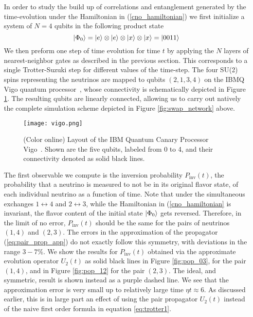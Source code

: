 \documentclass[10pt]{article}
\begin{document}
In order to study the build up of correlations and entanglement generated by the time-evolution under the Hamiltonian in (\ref{cno_hamiltonian}) we first initialize a system of $N=4$ qubits in the following product state 
\begin{equation}
\ket{\Phi_0} = \ket{e}\otimes\ket{e}\otimes\ket{x}\otimes\ket{x} = \ket{0011}
\end{equation}
We then preform one step of time evolution for time $t$ by applying the $N$ layers of nearest-neighbor gates as described in the previous section. This corresponds to a single Trotter-Suzuki step for different values of the time-step.
The four SU(2) spins representing the neutrinos are mapped to qubits $(2,1,3,4)$ on the IBMQ Vigo quantum processor~\cite{IBMQ_Vigo}, whose connectivity is schematically depicted in Figure \ref{fig:vigo}. The resulting qubits are linearly connected, allowing us to carry out natively the complete simulation scheme depicted in Figure \ref{fig:swap_network} above.

\begin{figure}[h]
    \centering
    \texttt{[image: vigo.png]}
    \caption{(Color online) Layout of the IBM Quantum Canary Processor Vigo~\cite{IBMQ_Vigo}. Shown are the five qubits, labeled from 0 to 4, and their connectivity denoted as solid black lines.}
    \label{fig:vigo}
\end{figure}

The first observable we compute is the inversion probability $P_{\text{inv}}(t)$, the probability that a neutrino is measured to not be in its original flavor state, of each individual neutrino as a function of time. Note that under the simultaneous exchanges $1\leftrightarrow4$ and $2\leftrightarrow3$, while the Hamiltonian in (\ref{cno_hamiltonian} is invariant, the flavor content of the initial state $\ket{\Phi_0}$ gets reversed. Therefore, in the limit of no error, $P_{\text{inv}}(t)$ should be the same for the pairs of neutrinos $(1,4)$ and $(2,3)$. The errors in the approximation of the propagator (\ref{eq:pair_prop_app}) do not exactly follow this symmetry, with deviations in the range $3-7\%$. We show the results for $P_{\text{inv}}(t)$ obtained via the approximate evolution operator $U_2(t)$ as solid black lines in Figure \ref{fig:pop_03}, for the pair $(1,4)$, and in Figure \ref{fig:pop_12} for the pair $(2,3)$. The ideal, and symmetric, result is shown instead as a purple dashed line. We see that the approximation error is very small up to relatively large time $\eta t\approx 6$. As discussed earlier, this is in large part an effect of using the pair propagator $U_2(t)$ instead of the naive first order formula in equation \ref{eq:trotter1}. 
\end{document}

